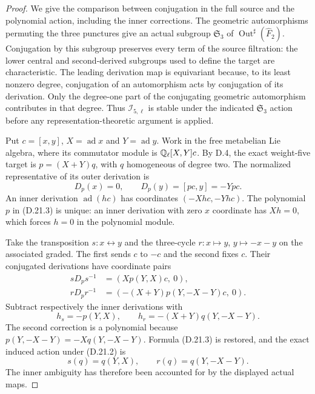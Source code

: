 \begin{proof}
We give the comparison between conjugation in the full source
and the polynomial action, including the inner corrections.
The geometric automorphisms permuting the three punctures give
an actual subgroup $\mathfrak S_3$ of
$\operatorname{Out}^{\sharp}(\widehat F_2)$. Conjugation by
this subgroup preserves every term of the source filtration:
the lower central and second-derived subgroups used to define
the target are characteristic. The leading derivation map is
equivariant because, to its least nonzero degree, conjugation
of an automorphism acts by conjugation of its derivation.
Only the degree-one part of the conjugating geometric
automorphism contributes in that degree. Thus
$\mathscr I_{5,\ell}$ is stable under the indicated
$\mathfrak S_3$ action before any representation-theoretic
argument is applied.

Put $c=[x,y]$, $X=\operatorname{ad}x$ and
$Y=\operatorname{ad}y$. Work in the free metabelian Lie
algebra, where its commutator module is
$\mathbb Q_\ell[X,Y]c$. By D.4, the exact weight-five target is
$p=(X+Y)q$, with $q$ homogeneous of degree two.
The normalized representative of its outer derivation is
\[
        D_p(x)=0,\qquad D_p(y)=[pc,y]=-Ypc.
        \tag{D.21.3}
\]
An inner derivation $\operatorname{ad}(hc)$ has coordinates
$(-Xhc,-Yhc)$. The polynomial $p$ in (D.21.3) is unique:
an inner derivation with zero $x$ coordinate has $Xh=0$,
which forces $h=0$ in the polynomial module.

Take the transposition $s:x\leftrightarrow y$ and the
three-cycle $r:x\mapsto y$, $y\mapsto-x-y$ on the
associated graded. The first sends $c$ to $-c$ and the
second fixes $c$. Their conjugated derivations have
coordinate pairs
\[
 \begin{split}
 sD_ps^{-1}&=(X p(Y,X)c,\ 0),\\
 rD_pr^{-1}&=(-(X+Y)p(Y,-X-Y)c,\ 0).
 \end{split}                                               \tag{D.21.4}
\]
Subtract respectively the inner derivations with
\[
 h_s=-p(Y,X),\qquad
 h_r=-(X+Y)q(Y,-X-Y).
\]
The second correction is a polynomial because
$p(Y,-X-Y)=-Xq(Y,-X-Y)$. Formula (D.21.3) is restored,
and the exact induced action under (D.21.2) is
\[
              s(q)=q(Y,X),\qquad r(q)=q(Y,-X-Y).
              \tag{D.21.5}
\]
The inner ambiguity has therefore been accounted for by
the displayed actual maps.


\end{proof}
